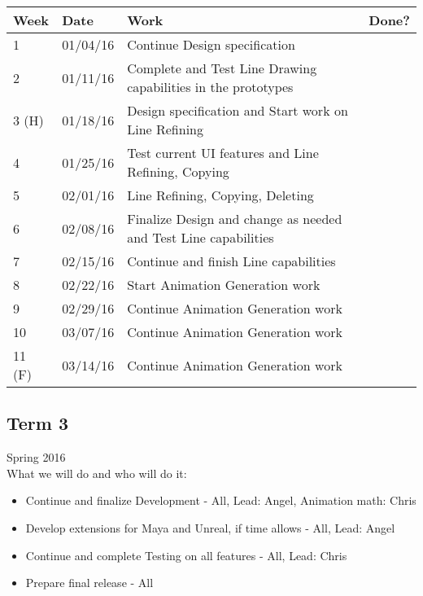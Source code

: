 \begin{table}[H]
\centering
\begin{tabular}{|l|l|l|l|}
\hline
Week 	& Date	 		& Work	 		& 	Done?	 \\ \hline
1		& 01/04/16	 	& Continue Design specification		& 			 \\ \hline
2		& 01/11/16	 	& \specialcell{Complete and Test Line Drawing  \\ capabilities in the prototypes}		& 			 \\ \hline
3 (H)	& 01/18/16	 	& Design specification and Start work on Line Refining		& 			 \\ \hline
4		& 01/25/16	 	& Test current UI features and Line Refining, Copying		& 			 \\ \hline
5		& 02/01/16	 	& Line Refining, Copying, Deleting		& 			 \\ \hline
6		& 02/08/16	 	& \specialcell{Finalize Design and change as needed \\ and Test Line capabilities}		& 			 \\ \hline
7		& 02/15/16	 	& Continue and finish Line capabilities		& 			 \\ \hline
8		& 02/22/16	 	& Start Animation Generation work		& 			 \\ \hline
9		& 02/29/16	 	& Continue Animation Generation work		& 			 \\ \hline
10		& 03/07/16	 	& Continue Animation Generation work			& 			 \\ \hline
11 (F)	& 03/14/16	 	& Continue Animation Generation work			& 			 \\ \hline
\end{tabular}
\end{table}

\subsection{Term 3}
Spring 2016 \\
What we will do and who will do it:
\begin{itemize}
	\item Continue and finalize Development - All, Lead: Angel, Animation math: Chris
	\item Develop extensions for Maya and Unreal, if time allows - All, Lead: Angel
	\item Continue and complete Testing on all features - All, Lead: Chris
	\item Prepare final release - All
\end{itemize}

